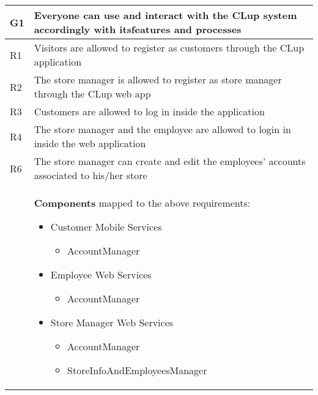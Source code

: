 \begin{center}
    {\renewcommand{\arraystretch}{1.5}
    \begin{longtable}{L{2.5cm}L{12cm}}
        \hline
        \textbf{G1} & \textbf{Everyone can use and interact with the CLup system accordingly with itsfeatures and processes} \\
        \hline
         R1 & Visitors are allowed to register as customers through the CLup application \\
        \hline
         R2 & The store manager is allowed to register as store manager through the CLup web app \\
        \hline
         R3 & Customers are allowed to log in inside the application \\
        \hline
         R4 & The store manager and the employee are allowed to login in inside the web application \\
        \hline
         R6 & The store manager can create and edit the employees’ accounts associated to his/her store \\
        \hline
         & \textbf{Components} mapped to the above requirements:

        \medskip
        \medskip
        \begin{itemize}
            \item Customer Mobile Services \begin{itemize}
                \item AccountManager
            \end{itemize}
            \item Employee Web Services \begin{itemize}
                \item AccountManager
            \end{itemize}
            \item Store Manager Web Services \begin{itemize}
                \item AccountManager
                \item StoreInfoAndEmployeesManager
            \end{itemize}
        \end{itemize} \\
        \hline
    \end{longtable}}


\end{center}
